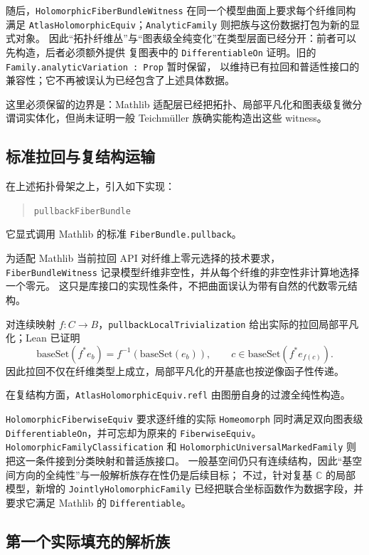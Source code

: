 \documentclass[UTF8,fontset=none,a4paper,11pt]{ctexart}
\begin{document}
随后，\texttt{HolomorphicFiberBundleWitness} 在同一个模型曲面上要求每个纤维同构满足
\texttt{AtlasHolomorphicEquiv}；\texttt{AnalyticFamily} 则把族与这份数据打包为新的显式对象。
因此“拓扑纤维丛”与“图表级全纯变化”在类型层面已经分开：前者可以先构造，后者必须额外提供
复图表中的 \texttt{DifferentiableOn} 证明。旧的 \texttt{Family.analyticVariation : Prop} 暂时保留，
以维持已有拉回和普适性接口的兼容性；它不再被误认为已经包含了上述具体数据。

这里必须保留的边界是：Mathlib 适配层已经把拓扑、局部平凡化和图表级复微分谓词实体化，但尚未证明一般 Teichmüller 族确实能构造出这些 witness。

\subsection{标准拉回与复结构运输}

在上述拓扑骨架之上，引入如下实现：
\begin{quote}
\texttt{pullbackFiberBundle}
\end{quote}
它显式调用 Mathlib 的标准 \texttt{FiberBundle.pullback}。

为适配 Mathlib 当前拉回 API 对纤维上零元选择的技术要求，
\texttt{FiberBundleWitness} 记录模型纤维非空性，并从每个纤维的非空性非计算地选择一个零元。
这只是库接口的实现性条件，不把曲面误认为带有自然的代数零元结构。

对连续映射 $f:C\to B$，\texttt{pullbackLocalTrivialization} 给出实际的拉回局部平凡化；Lean 已证明
\[
  \mathrm{baseSet}(f^*e_b)=f^{-1}(\mathrm{baseSet}(e_b)),
  \qquad
  c\in\mathrm{baseSet}(f^*e_{f(c)}).
\]
因此拉回不仅在纤维类型上成立，局部平凡化的开基底也按逆像函子性传递。

在复结构方面，\texttt{AtlasHolomorphicEquiv.refl} 由图册自身的过渡全纯性构造。

\texttt{HolomorphicFiberwiseEquiv} 要求逐纤维的实际 \texttt{Homeomorph} 同时满足双向图表级
\texttt{DifferentiableOn}，并可忘却为原来的 \texttt{FiberwiseEquiv}。
\texttt{HolomorphicFamilyClassification} 和
\texttt{HolomorphicUniversalMarkedFamily} 则把这一条件接到分类映射和普适族接口。
一般基空间仍只有连续结构，因此“基空间方向的全纯性”与一般解析族存在性仍是后续目标；
不过，针对复基 $\mathbb C$ 的局部模型，新增的
\texttt{JointlyHolomorphicFamily} 已经把联合坐标函数作为数据字段，并要求它满足 Mathlib 的
\texttt{Differentiable}。

\clearpage
\subsection{第一个实际填充的解析族}
\end{document}
